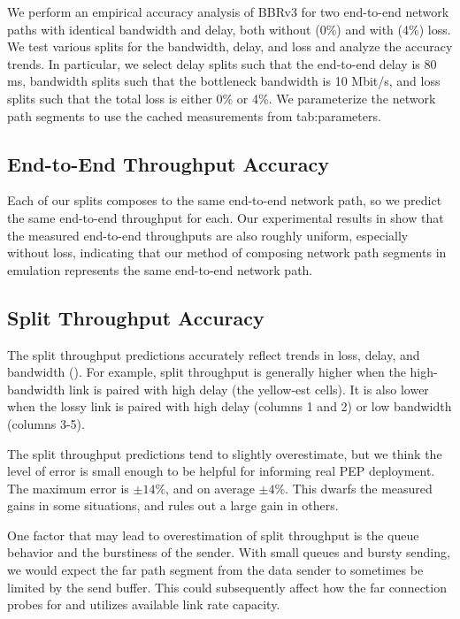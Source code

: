 We perform an empirical accuracy analysis of BBRv3 for two end-to-end network paths with
identical bandwidth and delay, both without (0\%) and with (4\%) loss. We test
various splits for the bandwidth, delay, and loss and analyze the accuracy
trends. In particular, we select delay splits such that the end-to-end delay is
80 ms, bandwidth splits such that the bottleneck bandwidth is 10 Mbit/s, and loss
splits such that the total loss is either 0\% or 4\%. We parameterize the network
path segments to use the cached measurements from \Cref
{tab:parameters}.

\subsection{End-to-End Throughput Accuracy}

Each of our splits composes to the same end-to-end network path, so we predict
the same end-to-end throughput for each. Our experimental
results in  show that the measured end-to-end
throughputs are also roughly uniform, especially without loss, indicating that
our method of composing network path segments in emulation represents the same
end-to-end network path.

\subsection{Split Throughput Accuracy}

The split throughput predictions accurately reflect trends in loss, delay, and
bandwidth (). For example, split throughput is
generally higher when the high-bandwidth link is paired with high delay
(the yellow-est cells). It is also lower when the lossy link is paired with
high delay (columns 1 and 2) or low bandwidth (columns 3-5).

The split throughput predictions tend to slightly overestimate, but we think
the level of error is small enough to be helpful for informing real PEP
deployment. The maximum error is $\pm14\%$, and on average $\pm4\%$. This
dwarfs the measured gains in some situations, and rules out a large gain in
others.

One factor that may lead to overestimation of split throughput is the queue
behavior and the burstiness of the sender. With small queues and bursty
sending, we would expect the far path segment from the data sender to sometimes
be limited by the send buffer. This could subsequently affect how the far
connection probes for and utilizes available link rate capacity.

